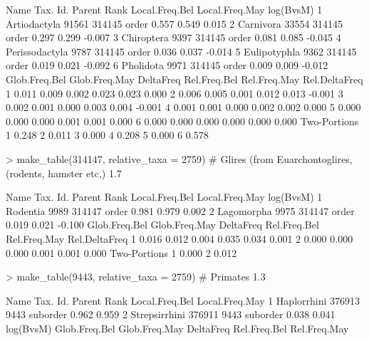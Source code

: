 \documentclass{article}
\begin{document}
\begin{Schunk}
\begin{Soutput}
            Name Tax. Id. Parent  Rank Local.Freq.Bel Local.Freq.May log(BvsM)
1   Artiodactyla    91561 314145 order          0.557          0.549     0.015
2      Carnivora    33554 314145 order          0.297          0.299    -0.007
3     Chiroptera     9397 314145 order          0.081          0.085    -0.045
4 Perissodactyla     9787 314145 order          0.036          0.037    -0.014
5   Eulipotyphla     9362 314145 order          0.019          0.021    -0.092
6      Pholidota     9971 314145 order          0.009          0.009    -0.012
  Glob.Freq.Bel Glob.Freq.May DeltaFreq Rel.Freq.Bel Rel.Freq.May Rel.DeltaFreq
1         0.011         0.009     0.002        0.023        0.023         0.000
2         0.006         0.005     0.001        0.012        0.013        -0.001
3         0.002         0.001     0.000        0.003        0.004        -0.001
4         0.001         0.001     0.000        0.002        0.002         0.000
5         0.000         0.000     0.000        0.001        0.001         0.000
6         0.000         0.000     0.000        0.000        0.000         0.000
  Two-Portions
1        0.248
2        0.011
3        0.000
4        0.208
5        0.000
6        0.578
\end{Soutput}
\begin{Sinput}
> make_table(314147, relative_taxa = 2759) # Glires (from Euarchontoglires,  (rodents, hamster etc,) 1.7% and 1.3%
\end{Sinput}
\begin{Soutput}
        Name Tax. Id. Parent  Rank Local.Freq.Bel Local.Freq.May log(BvsM)
1   Rodentia     9989 314147 order          0.981          0.979     0.002
2 Lagomorpha     9975 314147 order          0.019          0.021    -0.100
  Glob.Freq.Bel Glob.Freq.May DeltaFreq Rel.Freq.Bel Rel.Freq.May Rel.DeltaFreq
1         0.016         0.012     0.004        0.035        0.034         0.001
2         0.000         0.000     0.000        0.001        0.001         0.000
  Two-Portions
1        0.000
2        0.012
\end{Soutput}
\begin{Sinput}
> make_table(9443, relative_taxa = 2759)   # Primates 1.3% and 1.0%
\end{Sinput}
\begin{Soutput}
           Name Tax. Id. Parent     Rank Local.Freq.Bel Local.Freq.May
1   Haplorrhini   376913   9443 suborder          0.962          0.959
2 Strepsirrhini   376911   9443 suborder          0.038          0.041
  log(BvsM) Glob.Freq.Bel Glob.Freq.May DeltaFreq Rel.Freq.Bel Rel.Freq.May

\end{Soutput}
\end{Schunk}
\end{document}
